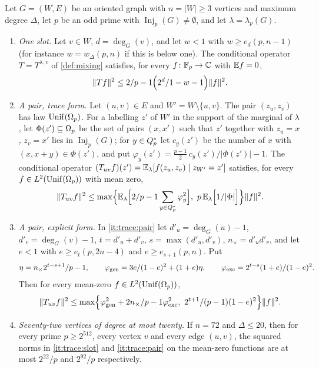 \begin{lemma}\label{lem:trace-mixing}
Let $G=(W,E)$ be an oriented graph with $n=|W|\ge3$ vertices and maximum degree
$\Delta$, let $p$ be an odd prime with $\operatorname{Inj}_p(G)\ne\emptyset$, and
let $\lambda=\lambda_p(G)$.
\begin{enumerate}[label=\textup{(\alph*)}]
\item\label{it:trace:slot} \emph{One slot.} Let $v\in W$, $d=\deg_G(v)$, and let
 $w<1$ with $w\ge e_d(p,n-1)$ (for instance $w=w_\Delta(p,n)$ if this is below
 one). The conditional
 operator $T=T^{\lambda,v}$ of \cref{def:mixing} satisfies, for every
 $f\colon\Fp\to\C$ with $\E f=0$,
 \[
  \|Tf\|^2\le\frac2{p-1}\Bigl(\frac{2^d}{1-w}-1\Bigr)\|f\|^2 .
 \]
\item\label{it:trace:pair} \emph{A pair, trace form.} Let $(u,v)\in E$ and
 $W'=W\setminus\{u,v\}$. The pair $(z_u,z_v)$ has law $\Unif(\Om)$. For a
 labelling $z'$ of $W'$ in the support of the marginal of $\lambda$, let
 $\Phi(z')\subseteq\Om$ be the set of pairs $(x,x')$ such that $z'$ together with
 $z_u=x$, $z_v=x'$ lies in $\operatorname{Inj}_p(G)$; for $y\in\Qsq$ let
 $c_y(z')$ be the number of $x$ with $(x,x+y)\in\Phi(z')$, and put
 $\varphi_y(z')=\frac{p-1}2\,c_y(z')/|\Phi(z')|-1$. The conditional operator
 $(T_{uv}f)(z')=\E_\lambda[f(z_u,z_v)\mid z_{W'}=z']$ satisfies, for every
 $f\in L^2(\Unif(\Om))$ with mean zero,
 \[
  \|T_{uv}f\|^2\le\max\Bigl\{\E_\lambda\Bigl[\frac2{p-1}\sum_{y\in\Qsq}\varphi_y^2\Bigr],\
  p\,\E_\lambda\Bigl[\frac1{|\Phi|}\Bigr]\Bigr\}\|f\|^2 .
 \]
\item\label{it:trace:explicit} \emph{A pair, explicit form.} In \ref{it:trace:pair}
 let $d'_u=\deg_G(u)-1$, $d'_v=\deg_G(v)-1$, $t=d'_u+d'_v$, $s=\max(d'_u,d'_v)$,
 $n_\times=d'_ud'_v$, and let $e<1$ with $e\ge e_t(p,2n-4)$ and $e\ge e_{s+1}(p,n)$.
 Put
 \[
  \eta=\frac{n_\times2^{t-s+1}}{p-1},\qquad
  \varphi_{\rm gen}=\frac{3e}{(1-e)^2}+(1+e)\eta,\qquad
  \varphi_{\rm exc}=\frac{2^{t-s}(1+e)}{(1-e)^2} .
 \]
 Then for every mean-zero $f\in L^2(\Unif(\Om))$,
 \[
  \|T_{uv}f\|^2\le\max\Bigl\{\varphi_{\rm gen}^2+\frac{2n_\times}{p-1}\varphi_{\rm exc}^2,\
  \frac{2^{t+1}}{(p-1)(1-e)^2}\Bigr\}\|f\|^2 .
 \]
\item\label{it:trace:72} \emph{Seventy-two vertices of degree at most twenty.} If
 $n=72$ and $\Delta\le20$, then for every prime $p\ge2^{512}$, every vertex $v$ and
 every edge $(u,v)$, the squared norms in \ref{it:trace:slot} and
 \ref{it:trace:pair} on the mean-zero functions are at most $2^{22}/p$ and
 $2^{92}/p$ respectively.
\end{enumerate}
\end{lemma}

